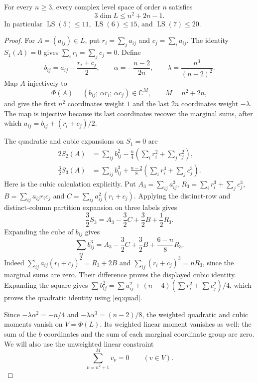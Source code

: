 \begin{theorem}
\label{thm:weighted-bound}
For every $n\ge3$, every complex level space of order $n$ satisfies
\[
 3\dim L\le n^2+2n-1.
\]
In particular
$\operatorname{LS}(5)\le11$,
$\operatorname{LS}(6)\le15$, and
$\operatorname{LS}(7)\le20$.
\end{theorem}
\begin{proof}
For $A=(a_{ij})\in L$, put
$r_i=\sum_j a_{ij}$ and $c_j=\sum_i a_{ij}$.
The identity $S_1(A)=0$ gives
$\sum_i r_i=\sum_j c_j=0$.
Define
\[
 b_{ij}=a_{ij}-\frac{r_i+c_j}{2},\qquad
 \alpha=-\frac{n-2}{2n},\qquad
 \lambda=\frac{n^3}{(n-2)^2}.
\]
Map $A$ injectively to
\[
 \Phi(A)=(b_{ij};\,\alpha r_i;\,\alpha c_j)
 \in\mathbb C^M,\qquad M=n^2+2n,
\]
and give the first $n^2$ coordinates weight $1$ and the last $2n$
coordinates weight $-\lambda$.
The map is injective because its last coordinates recover the
marginal sums, after which
$a_{ij}=b_{ij}+(r_i+c_j)/2$.

The quadratic and cubic expansions on $S_1=0$ are
\begin{align*}
 2S_2(A)
 &=\sum_{ij}b_{ij}^2
       -\frac n4\left(\sum_i r_i^2+\sum_j c_j^2\right),\\
 \frac32S_3(A)
 &=\sum_{ij}b_{ij}^3
       +\frac{n-2}{8}\left(\sum_i r_i^3+\sum_j c_j^3\right).
\end{align*}
Here is the cubic calculation explicitly. Put $A_3=\sum_{ij}a_{ij}^3$, $R_3=\sum_i r_i^3+\sum_jc_j^3$, $B=\sum_{ij}a_{ij}r_ic_j$ and $C=\sum_{ij}a_{ij}^2(r_i+c_j)$. Applying the distinct-row and distinct-column partition expansion on three labels gives
\[
 \frac32S_3=A_3-\frac32C+\frac32B+\frac12R_3.
\]
Expanding the cube of $b_{ij}$ gives
\[
 \sum_{ij}b_{ij}^3=A_3-\frac32C+\frac32B+\frac{6-n}{8}R_3.
\]
Indeed $\sum_{ij}a_{ij}(r_i+c_j)^2=R_3+2B$ and $\sum_{ij}(r_i+c_j)^3=nR_3$, since the marginal sums are zero. Their difference proves the displayed cubic identity. Expanding the square gives $\sum b_{ij}^2=\sum a_{ij}^2+(n-4)(\sum r_i^2+\sum c_j^2)/4$, which proves the quadratic identity using \eqref{eq:quad}.

Since $-\lambda\alpha^2=-n/4$ and
$-\lambda\alpha^3=(n-2)/8$, the weighted quadratic and cubic moments
vanish on $V=\Phi(L)$.
Its weighted linear moment vanishes as well: the sum of the
$b$ coordinates and the sum of each marginal coordinate group
are zero. We will also use the unweighted linear constraint
\begin{equation}
 \sum_{\nu=n^2+1}^{M}v_\nu=0\qquad(v\in V).
 \label{eq:weighted-extra-sum}
\end{equation}


\end{proof}
